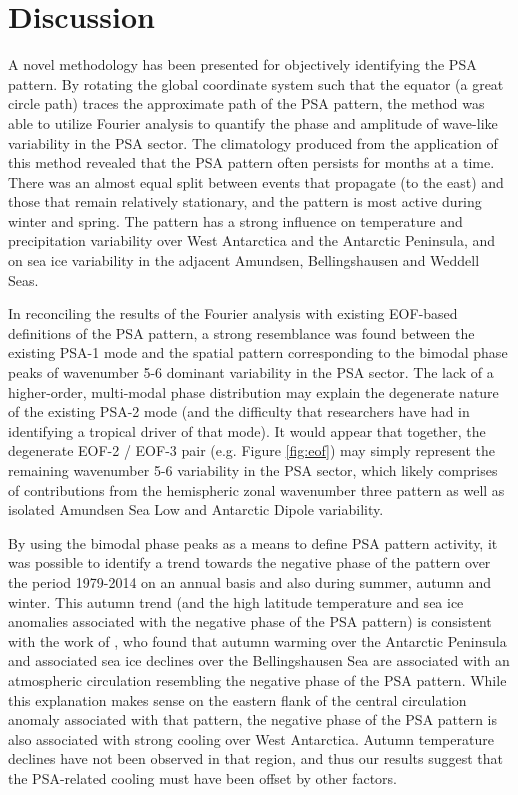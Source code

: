 \section{Discussion}

A novel methodology has been presented for objectively identifying the PSA pattern. By rotating the global coordinate system such that the equator (a great circle path) traces the approximate path of the PSA pattern, the method was able to utilize Fourier analysis to quantify the phase and amplitude of wave-like variability in the PSA sector. The climatology produced from the application of this method revealed that the PSA pattern often persists for months at a time. There was an almost equal split between events that propagate (to the east) and those that remain relatively stationary, and the pattern is most active during winter and spring. The pattern has a strong influence on temperature and precipitation variability over West Antarctica and the Antarctic Peninsula, and on sea ice variability in the adjacent Amundsen, Bellingshausen and Weddell Seas. 

In reconciling the results of the Fourier analysis with existing EOF-based definitions of the PSA pattern, a strong resemblance was found between the existing PSA-1 mode and the spatial pattern corresponding to the bimodal phase peaks of wavenumber 5-6 dominant variability in the PSA sector. The lack of a higher-order, multi-modal phase distribution may explain the degenerate nature of the existing PSA-2 mode (and the difficulty that researchers have had in identifying a tropical driver of that mode). It would appear that together, the degenerate EOF-2 / EOF-3 pair (e.g. Figure \ref{fig:eof}) may simply represent the remaining wavenumber 5-6 variability in the PSA sector, which likely comprises of contributions from the hemispheric zonal wavenumber three pattern as well as isolated Amundsen Sea Low and Antarctic Dipole variability.    

By using the bimodal phase peaks as a means to define PSA pattern activity, it was possible to identify a trend towards the negative phase of the pattern over the period 1979-2014 on an annual basis and also during summer, autumn and winter. This autumn trend (and the high latitude temperature and sea ice anomalies associated with the negative phase of the PSA pattern) is consistent with the work of \citet{Ding2013}, who found that autumn warming over the Antarctic Peninsula and associated sea ice declines over the Bellingshausen Sea are associated with an atmospheric circulation resembling the negative phase of the PSA pattern. While this explanation makes sense on the eastern flank of the central circulation anomaly associated with that pattern, the negative phase of the PSA pattern is also associated with strong cooling over West Antarctica. Autumn temperature declines have not been observed in that region, and thus our results suggest that the PSA-related cooling must have been offset by other factors. 

